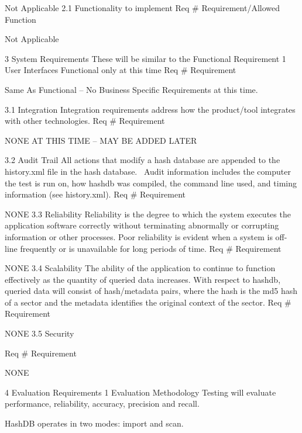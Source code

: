 \documentclass[12pt,twoside]{article}
\begin{document}
Not Applicable
2.1 Functionality to implement
Req #
Requirement/Allowed Function

Not Applicable









3 System Requirements
These will be similar to the Functional Requirement
1 User Interfaces
Functional only at this time
Req #
Requirement

Same As Functional – No Business Specific Requirements at this time.


3.1 Integration
Integration requirements address how the product/tool integrates with other technologies.
Req #
Requirement

NONE AT THIS TIME – MAY BE ADDED LATER


3.2 Audit Trail
All actions that modify a hash database are appended to the history.xml file in the hash database.  Audit information includes the computer the test is run on, how hashdb was compiled, the command line used, and timing information (see history.xml).
Req #
Requirement

NONE
3.3 Reliability
Reliability is the degree to which the system executes the application software correctly without terminating abnormally or corrupting information or other processes.  Poor reliability is evident when a system is off-line frequently or is unavailable for long periods of time. 
Req #
Requirement

NONE
3.4 Scalability
The ability of the application to continue to function effectively as the quantity of queried data increases. With respect to hashdb, queried data will consist of hash/metadata pairs, where the hash is the md5 hash of a sector and the metadata identifies the original context of the sector.
Req #
Requirement

NONE
3.5 Security

Req #
Requirement

NONE



4 Evaluation Requirements
1 Evaluation Methodology
Testing will evaluate performance, reliability, accuracy, precision and recall.

HashDB operates in two modes: import and scan. 
\end{document}
